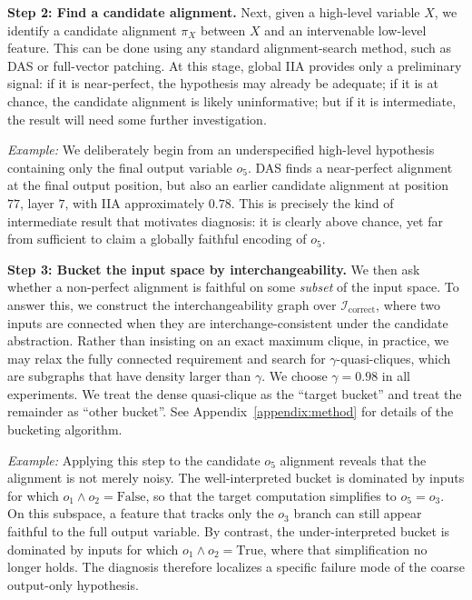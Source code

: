 \textbf{Step 2: Find a candidate alignment.}
Next, given a high-level variable \(X\), we identify a candidate alignment \(\pi_X\) between \(X\) and an intervenable low-level feature. This can be done using any standard alignment-search method, such as DAS or full-vector patching. At this stage, global IIA provides only a preliminary signal: if it is near-perfect, the hypothesis may already be adequate; if it is at chance, the candidate alignment is likely uninformative; but if it is intermediate, the result will need some further investigation.

\textit{Example:} We deliberately begin from an underspecified high-level hypothesis containing only the final output variable \(o_5\). DAS finds a near-perfect alignment at the final output position, but also an earlier candidate alignment at position \(77\), layer \(7\), with IIA approximately \(0.78\). This is precisely the kind of intermediate result that motivates diagnosis: it is clearly above chance, yet far from sufficient to claim a globally faithful encoding of \(o_5\).

\textbf{Step 3: Bucket the input space by interchangeability.}
We then ask whether a non-perfect alignment is faithful on some \emph{subset} of the input space. To answer this, we construct the interchangeability graph over \(\mathcal I_{\mathrm{correct}}\), where two inputs are connected when they are interchange-consistent under the candidate abstraction. Rather than insisting on an exact maximum clique, in practice, we may relax the fully connected requirement and search for $\gamma$-quasi-cliques, which are subgraphs that have density larger than $\gamma$. We choose $\gamma = 0.98$ in all experiments. We treat the dense quasi-clique as the ``target bucket'' and treat the remainder as ``other bucket''. See Appendix~\ref{appendix:method} for details of the bucketing algorithm.

\textit{Example:} Applying this step to the candidate \(o_5\) alignment reveals that the alignment is not merely noisy. The well-interpreted bucket is dominated by inputs for which \(
o_1 \wedge o_2 = \mathrm{False}\), so that the target computation simplifies to \(o_5 = o_3\). On this subspace, a feature that tracks only the \(o_3\) branch can still appear faithful to the full output variable. By contrast, the under-interpreted bucket is dominated by inputs for which \(o_1 \wedge o_2=\mathrm{True}\), where that simplification no longer holds. The diagnosis therefore localizes a specific failure mode of the coarse output-only hypothesis.

